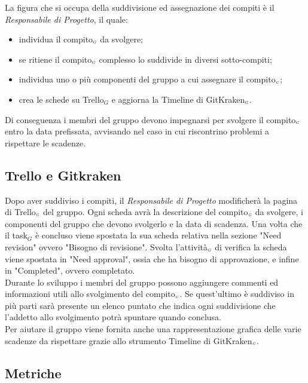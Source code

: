 La figura che si occupa della suddivisione ed assegnazione dei compiti è il \textit{Responsabile di Progetto}, il quale:
\begin{itemize}
	\item individua il compito$_{\scaleto{G}{3pt}}$ da svolgere;
	\item se ritiene il compito$_{\scaleto{G}{3pt}}$ complesso lo suddivide in diversi sotto-compiti;
	\item individua uno o più componenti del gruppo a cui assegnare il compito$_{\scaleto{G}{3pt}}$;
	\item crea le schede su Trello$_G$ e aggiorna la Timeline di GitKraken$_{\scaleto{G}{3pt}}$.
\end{itemize}

Di conseguenza i membri del gruppo devono impegnarsi per svolgere il compito$_{\scaleto{G}{3pt}}$ entro la data prefissata, avvisando nel caso in cui riscontrino problemi a rispettare le scadenze.

\subsection{Trello e Gitkraken}\label{ProcessiOrganizzativiProcessoDiPianificazioneTrelloEGitkraken}

Dopo aver suddiviso i compiti, il \textit{Responsabile di Progetto} modificherà la pagina di Trello$_{\scaleto{G}{3pt}}$ del gruppo. Ogni scheda avrà la descrizione del compito$_{\scaleto{G}{3pt}}$ da svolgere, i componenti del gruppo che devono svolgerlo e la data di scadenza.
Una volta che il task$_G$ è concluso viene spostata la sua scheda relativa nella sezione "Need revision" ovvero "Bisogno di revisione".
Svolta l'attività$_{\scaleto{G}{3pt}}$ di verifica la scheda viene spostata in "Need approval", ossia che ha bisogno di approvazione, e infine in "Completed", ovvero completato.\\
Durante lo sviluppo i membri del gruppo possono aggiungere commenti ed informazioni utili allo svolgimento del compito$_{\scaleto{G}{3pt}}$. Se quest'ultimo è suddiviso in più parti sarà presente un elenco puntato che indica ogni suddivisione che l'addetto allo svolgimento potrà spuntare quando conclusa. \\
Per aiutare il gruppo viene fornita anche una rappresentazione grafica delle varie scadenze da rispettare grazie allo strumento Timeline di GitKraken$_{\scaleto{G}{3pt}}$.

\subsection{Metriche}\label{ProcessiOrganizzativiProcessoDiPianificazioneMetriche}

